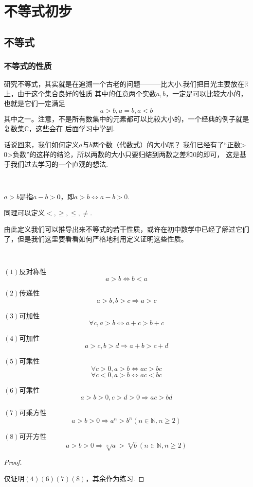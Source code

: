 \chapter{不等式初步}

\section{不等式}
\subsection{不等式的性质}
研究不等式，其实就是在追溯一个古老的问题———比大小.我们把目光主要放在$\mathbb{R}$上，由于这个集合良好的性质
其中的任意两个实数$a,b$，一定是可以比较大小的，也就是它们一定满足
\[a>b,a=b,a<b\]
其中之一。注意，不是所有数集中的元素都可以比较大小的，一个经典的例子就是复数集$\mathbb{C}$，这些会在
后面学习中学到.

话说回来，我们如何定义$a$与$b$两个数（代数式）的大小呢？
我们已经有了“正数>$0$>负数”的这样的结论，所以两数的大小只要归结到两数之差和$0$的即可，
这是基于我们过去学习的一个直观的想法.
\begin{definition}
    \ 

    $a>b$是指$a-b>0$，即$a>b\Leftrightarrow a-b>0$.

    同理可以定义$<,\geq,\leq,\neq$.

\end{definition}
由此定义我们可以推导出来不等式的若干性质，或许在初中数学中已经了解过它们了，但是我们这里要看看如何严格地利用定义证明这些性质。
\begin{character}
    \ 

    $(1)$反对称性\[a>b\Leftrightarrow b<a\]

    $(2)$传递性\[a>b,b>c \Rightarrow a>c\]

    $(3)$可加性\uppercase\expandafter{} \[\forall c,a>b\Leftrightarrow a+c>b+c\]

    $(4)$可加性\uppercase\expandafter{}\[a>c,b>d \Rightarrow a+b>c+d \]

    $(5)$可乘性\uppercase\expandafter{}
\[\forall c>0,a>b\Leftrightarrow ac>bc\]
\[\forall c<0,a>b\Leftrightarrow ac<bc\]

    $(6)$可乘性\uppercase\expandafter{}
\[a>b>0,c>d>0 \Rightarrow ac>bd\]

    $(7)$可乘方性
\[a>b>0 \Rightarrow a^n>b^n (n \in \mathbb{N} ,n\geq 2)\]

    $(8)$可开方性
\[a>b>0 \Rightarrow \sqrt[n]{a}>\sqrt[n]{b} (n \in \mathbb{N} ,n\geq 2)\]

\end{character}
\begin{proof}
    \ 

    仅证明$(4)(6)(7)(8)$，其余作为练习.
\end{proof}

